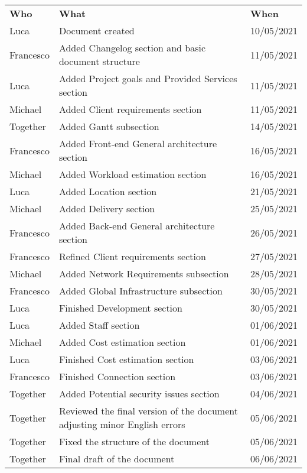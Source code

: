\begin{longtable}{ m{2cm}m{8cm}m{3cm}} 
\centering 
 \textbf{Who}& \textbf{What} & \textbf{When}\\
Luca &			Document created			& 																	10/05/2021\\
Francesco & 	Added Changelog section and basic document structure	&										11/05/2021\\
Luca &			Added Project goals and Provided Services section&												11/05/2021\\
Michael	& 		Added Client requirements section &																11/05/2021\\
Together &      Added Gantt subsection  &																		14/05/2021\\
Francesco &		Added Front-end General architecture section  & 												16/05/2021\\
Michael &		Added Workload estimation section & 															16/05/2021\\
Luca &			Added Location section                  &														21/05/2021\\
Michael &		Added Delivery section & 																		25/05/2021\\
Francesco &		Added Back-end General architecture section& 													26/05/2021\\
Francesco & 	Refined Client requirements section &															27/05/2021\\
Michael &		Added Network Requirements subsection &															28/05/2021\\
Francesco &		Added Global Infrastructure subsection & 														30/05/2021\\
Luca &			Finished Development section & 																	30/05/2021\\
Luca & 			Added Staff section & 																			01/06/2021\\
Michael &		Added Cost estimation section &				 													01/06/2021\\
Luca &			Finished Cost estimation section & 																03/06/2021\\
Francesco &		Finished Connection section  & 																	03/06/2021\\
Together &		Added Potential security issues section &  														04/06/2021\\
Together &		Reviewed the final version of the document adjusting minor English errors &  					05/06/2021\\
Together & 		Fixed the structure of the document  &  														05/06/2021\\
Together & 		Final draft of the document  &  														06/06/2021\\
\end{longtable}
\pagebreak
